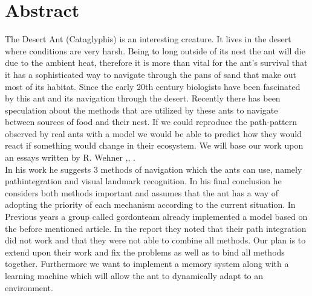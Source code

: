 \documentclass[11pt]{article}
\begin{document}



\tableofcontents

\newpage




\section{Abstract}
The Desert Ant (Cataglyphis) is an interesting creature. It lives in the desert where conditions are very harsh. Being to long outside of its nest the ant will die due to the ambient heat, therefore it is more than vital for the ant's survival that it has a sophisticated way to navigate through the pans of sand that make out most of its habitat. Since the early 20th century biologists have been fascinated by this ant and its navigation through the desert. Recently there has been speculation about the methods that are utilized by these ants to navigate between sources of food and their nest. If we could reproduce the path-pattern observed by real ants with a model we would be able to predict how they would react if something would change in their ecosystem.
We will base our work upon an essays written by R. Wehner \cite{Wehner2003},\cite{Wehner1988}, \cite{Wehner1998}.\\
 In his work he suggests 3 methods of navigation which the ants can use, namely pathintegration and visual landmark recognition. In his final conclusion he considers both methods important and assumes that the ant has a way of adopting the priority of each mechanism according to the current situation.
In Previous years a group called gordonteam\cite{GordonTeam2008} already implemented a model based on the before mentioned article. In the report they noted that their path integration did not work and that they were not able to combine all  methods. Our plan is to extend upon their work and fix the problems as well as to bind all methods together. Furthermore we want to implement a memory system along with a learning machine which will allow the ant to dynamically adapt to an environment.




\newpage
\end{document}
